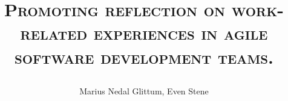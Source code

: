 \documentclass[a4paper, 12pt]{report}
\title{
    \begin{center}
        \textsc{Promoting reflection on work-related experiences in agile software development teams.}
    \end{center}
}
\author{Marius Nedal Glittum, Even Stene}
\begin{document}
\maketitle
{}





\tableofcontents

\listoffigures

\clearpage
{} 






















\begin{appendices}
	
    
    
    
    
    
    
\end{appendices}





\end{document}
